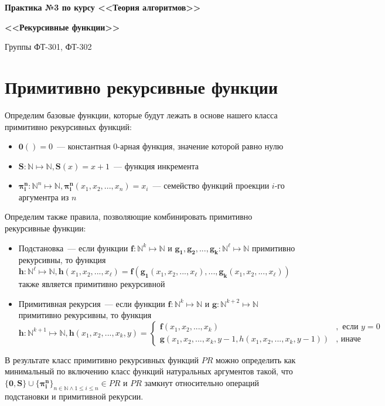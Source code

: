 \documentclass[
    11pt,
    a4paper
]{article}
\theoremstyle{definition}
\begin{document}
\centerline{\Large \bf Практика №3 по курсу <<Теория алгоритмов>>}
\centerline{\Large \bf <<Рекурсивные функции>>}
\centerline{Группы ФТ-301, ФТ-302}

\section{Примитивно рекурсивные функции}

Определим базовые функции, которые будут лежать в основе нашего класса примитивно рекурсивных функций:
\begin{itemize}
\item $\mathbf{0}() = 0$~--- константная 0-арная функция, значение которой равно нулю
\item $\mathbf{S}: \mathbb{N} \mapsto \mathbb{N}, \mathbf{S}(x) = x + 1$~--- функция инкремента
\item $\mathbf{\pi_i^n}: \mathbb{N}^n \mapsto \mathbb{N}, \mathbf{\pi_i^n}(x_1, x_2, ..., x_n) = x_i$~--- семейство функций проекции $i$-го аргументра из $n$ 
\end{itemize}

Определим также правила, позволяющие комбинировать примитивно рекурсивные функции:
\begin{itemize}
\item Подстановка~--- если функции $\mathbf{f}: \mathbb{N}^k \mapsto \mathbb{N}$ и $\mathbf{g_1}, \mathbf{g_2}, ..., \mathbf{g_k}: \mathbb{N}^\ell \mapsto \mathbb{N}$ примитивно рекурсивны, то функция $\mathbf{h}: \mathbb{N}^\ell \mapsto \mathbb{N}, \mathbf{h}(x_1, x_2, ..., x_\ell) = \mathbf{f}(\mathbf{g_1}(x_1, x_2, ..., x_\ell), ..., \mathbf{g_k}(x_1, x_2, ..., x_\ell))$ также является примитивно рекурсивной

\item Примитивная рекурсия~--- если функции $\mathbf{f}: \mathbb{N}^k \mapsto \mathbb{N}$ и $\mathbf{g}: \mathbb{N}^{k+2} \mapsto \mathbb{N}$ примитивно рекурсивны, то функция $\mathbf{h}: \mathbb{N}^{k+1} \mapsto \mathbb{N}, \mathbf{h}(x_1, x_2, ..., x_k, y) = \begin{cases}
\mathbf{f}(x_1, x_2, ..., x_k)&, \text{ если } y = 0\\
\mathbf{g}(x_1, x_2, ..., x_k, y - 1, h(x_1, x_2, ..., x_k, y - 1))&, \text{ иначе }
\end{cases}$
\end{itemize}

В результате класс примитивно рекурсивных функций $\mathit{PR}$ можно определить как минимальный по включению класс функций натуральных аргументов такой, что $\{\mathbf{0}, \mathbf{S}\} \cup \{\mathbf{\pi_i^n}\}_{n \in \mathbb{N} \wedge 1 \leq i \leq n} \in \mathit{PR}$ и $\mathit{PR}$ замкнут относительно операций подстановки и примитивной рекурсии.
\end{document}
